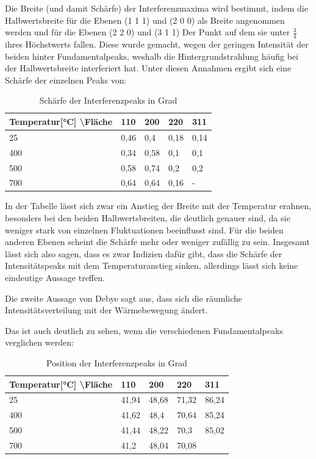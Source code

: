 \documentclass[
	a4paper,
	12pt,
	pagesize,
	ngerman
]{scrartcl}
\begin{document}
Die Breite (und damit Schärfe) der Interferenzmaxima wird bestimmt, indem die Halbwertsbreite für die Ebenen (1 1 1) und (2 0 0) als Breite angenommen werden und für die Ebenen (2 2 0) und (3 1 1)  Der Punkt auf dem sie unter $\frac{3}{4}$ ihres Höchstwerts fallen. Diese wurde gemacht, wegen der geringen Intensität der beiden hinter Fundamentalpeaks, weshalb die Hintergrundstrahlung häufig bei der Halbwertsbreite interferiert hat. Unter diesen Annahmen ergibt sich eine Schärfe der einzelnen Peaks von:
\begin{table}[h]
\caption{Schärfe der Interferenzpeaks in Grad}
\begin{tabular}{l|llll}
Temperatur[°C] \textbackslash{}Fläche & 110  & 200  & 220  & 311  \\ \hline
25                               & 0,46 & 0,4  & 0,18 & 0,14 \\
400                              & 0,34 & 0,58 & 0,1  & 0,1  \\
500                              & 0,58 & 0,74 & 0,2  & 0,2  \\
700                              & 0,64 & 0,64 & 0,16 & -   
\end{tabular}
\end{table}

In der Tabelle lässt sich zwar ein Anstieg der Breite mit der Temperatur erahnen, besonders bei den beiden Halbwertsbreiten, die deutlich genauer sind, da sie weniger stark von einzelnen Fluktuationen beeinflusst sind. Für die beiden anderen Ebenen scheint die Schärfe mehr oder weniger zufällig zu sein. Insgesamt lässt sich also sagen, dass es zwar Indizien dafür gibt, dass die Schärfe der Intensitätspeaks mit dem Temperaturanstieg sinken, allerdings lässt sich keine eindeutige Aussage treffen. 

Die zweite Aussage von Debye sagt aus, dass sich die räumliche Intensitätsverteilung mit der Wärmebewegung ändert.

Das ist auch deutlich zu sehen, wenn die verschiedenen Fundamentalpeaks verglichen werden:
\begin{table}[h]
\caption{Position der Interferenzpeaks in Grad}
\begin{tabular}{l|llll}
Temperatur[°C] \textbackslash{}Fläche & 110   & 200   & 220   & 311   \\ \hline
25                               & 41,94 & 48,68 & 71,32 & 86,24 \\
400                              & 41,62 & 48,4  & 70,64 & 85,24 \\
500                              & 41,44 & 48,22 & 70,3  & 85,02 \\
700                              & 41,2  & 48,04 & 70,08 &      
\end{tabular}
\end{table}
\end{document}
